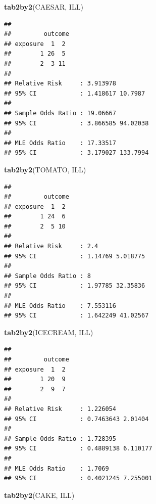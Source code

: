 \documentclass[12pt,a4paper]{book}
\newenvironment{Shaded}{\begin{snugshade}}{\end{snugshade}}
\newcommand{\KeywordTok}[1]{\textcolor[rgb]{0.13,0.29,0.53}{\textbf{#1}}}
\newcommand{\NormalTok}[1]{#1}
\theoremstyle{definition}
\theoremstyle{definition}
\theoremstyle{definition}
\theoremstyle{remark}
\begin{document}
\begin{Shaded}
\begin{Highlighting}[]
\KeywordTok{tab2by2}\NormalTok{(CAESAR, ILL)}
\end{Highlighting}
\end{Shaded}

\begin{verbatim}
## 
##         outcome
## exposure  1  2
##        1 26  5
##        2  3 11
## 
## Relative Risk     : 3.913978 
## 95% CI            : 1.418617 10.7987 
## 
## Sample Odds Ratio : 19.06667 
## 95% CI            : 3.866585 94.02038 
## 
## MLE Odds Ratio    : 17.33517 
## 95% CI            : 3.179027 133.7994
\end{verbatim}

\newpage

\begin{Shaded}
\begin{Highlighting}[]
\KeywordTok{tab2by2}\NormalTok{(TOMATO, ILL)}
\end{Highlighting}
\end{Shaded}

\begin{verbatim}
## 
##         outcome
## exposure  1  2
##        1 24  6
##        2  5 10
## 
## Relative Risk     : 2.4 
## 95% CI            : 1.14769 5.018775 
## 
## Sample Odds Ratio : 8 
## 95% CI            : 1.97785 32.35836 
## 
## MLE Odds Ratio    : 7.553116 
## 95% CI            : 1.642249 41.02567
\end{verbatim}

\begin{Shaded}
\begin{Highlighting}[]
\KeywordTok{tab2by2}\NormalTok{(ICECREAM, ILL)}
\end{Highlighting}
\end{Shaded}

\begin{verbatim}
## 
##         outcome
## exposure  1  2
##        1 20  9
##        2  9  7
## 
## Relative Risk     : 1.226054 
## 95% CI            : 0.7463643 2.01404 
## 
## Sample Odds Ratio : 1.728395 
## 95% CI            : 0.4889138 6.110177 
## 
## MLE Odds Ratio    : 1.7069 
## 95% CI            : 0.4021245 7.255001
\end{verbatim}

\newpage

\begin{Shaded}
\begin{Highlighting}[]
\KeywordTok{tab2by2}\NormalTok{(CAKE, ILL)}
\end{Highlighting}
\end{Shaded}
\end{document}
